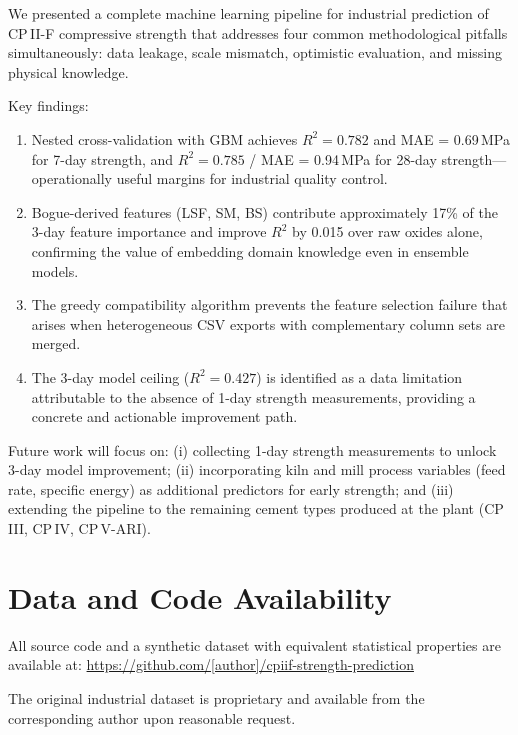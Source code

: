 \documentclass[preprint,12pt]{elsarticle}
\begin{document}
We presented a complete machine learning pipeline for industrial prediction of
CP\,II-F compressive strength that addresses four common methodological pitfalls
simultaneously: data leakage, scale mismatch, optimistic evaluation, and
missing physical knowledge.

Key findings:

\begin{enumerate}
  \item Nested cross-validation with GBM achieves $R^2 = 0.782$ and
        MAE = 0.69\,MPa for 7-day strength, and $R^2 = 0.785$ / MAE = 0.94\,MPa
        for 28-day strength---operationally useful margins for industrial
        quality control.
  \item Bogue-derived features (LSF, SM, BS) contribute approximately 17\% of
        the 3-day feature importance and improve $R^2$ by 0.015 over raw oxides
        alone, confirming the value of embedding domain knowledge even in
        ensemble models.
  \item The greedy compatibility algorithm prevents the feature selection
        failure that arises when heterogeneous CSV exports with complementary
        column sets are merged.
  \item The 3-day model ceiling ($R^2 = 0.427$) is identified as a data
        limitation attributable to the absence of 1-day strength measurements,
        providing a concrete and actionable improvement path.
\end{enumerate}

Future work will focus on: (i) collecting 1-day strength measurements to
unlock 3-day model improvement; (ii) incorporating kiln and mill process
variables (feed rate, specific energy) as additional predictors for early
strength; and (iii) extending the pipeline to the remaining cement types
produced at the plant (CP\,III, CP\,IV, CP\,V-ARI).

\section*{Data and Code Availability}

All source code and a synthetic dataset with equivalent statistical properties
are available at:
\url{https://github.com/[author]/cpiif-strength-prediction}

The original industrial dataset is proprietary and available from the
corresponding author upon reasonable request.
\end{document}
